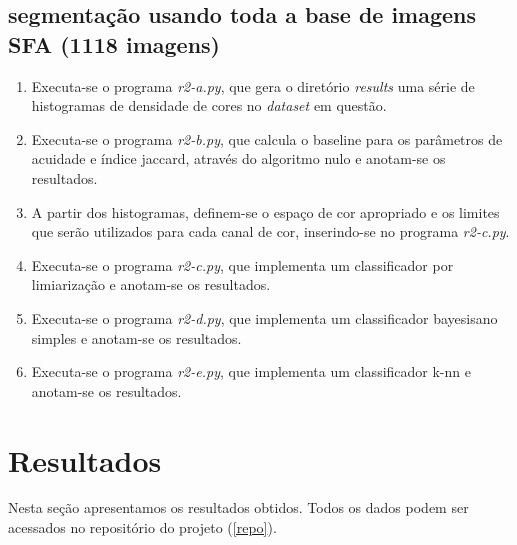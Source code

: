 \documentclass[conference]{IEEEtran}
\begin{document}
\subsection{segmentação usando toda a base de imagens SFA (1118 imagens)}
 \begin{enumerate}
  \item Executa-se o programa \textit{r2-a.py}, que gera o diretório \textit{results} uma série de histogramas de densidade de cores no \textit{dataset} em questão.
  \item Executa-se o programa \textit{r2-b.py}, que calcula o baseline para os parâmetros de acuidade e índice jaccard, através do algoritmo nulo e anotam-se os resultados. 
  \item A partir dos histogramas, definem-se o espaço de cor apropriado e os limites que serão utilizados para cada canal de cor, inserindo-se no  programa \textit{r2-c.py}.
  \item Executa-se o programa \textit{r2-c.py}, que implementa um classificador por limiarização e anotam-se os resultados.
  \item Executa-se o programa \textit{r2-d.py}, que implementa um classificador bayesisano simples e anotam-se os resultados.
   \item Executa-se o programa \textit{r2-e.py}, que implementa um classificador k-nn e anotam-se os resultados.
\end{enumerate}


\section{Resultados}
Nesta seção apresentamos os resultados obtidos. Todos os dados podem ser acessados no repositório do projeto (\ref{repo}).
\end{document}
